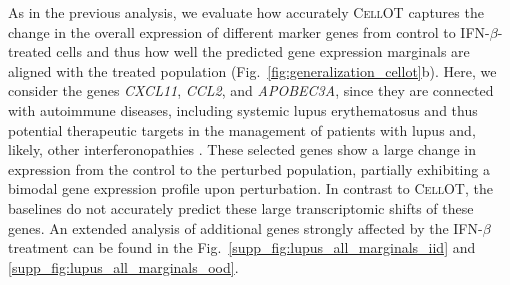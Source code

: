 As in the previous analysis, we evaluate how accurately \textsc{CellOT} captures the change in the overall expression of different marker genes from control to IFN-$\beta$-treated cells and thus how well the predicted gene expression marginals are aligned with the treated population (Fig.~\ref{fig:generalization_cellot}b). Here, we consider the genes \textit{CXCL11}, \textit{CCL2}, and \textit{APOBEC3A},
since they are connected with autoimmune diseases, including systemic lupus erythematosus \citep{hedrich2011epigenetic, perez2021sustained}
and thus potential therapeutic targets
in the management of patients with lupus and, likely, other interferonopathies \citep{mathian2015targeting,rani1996characterization,hedrich2011epigenetic,mathian2015targeting,perez2021sustained,flier2001differential}.
These selected genes show a large change in expression from the control to the perturbed population, partially exhibiting a bimodal gene expression profile upon perturbation. In contrast to \textsc{CellOT}, the baselines do not accurately predict these large transcriptomic shifts of these genes.
An extended analysis of additional genes strongly affected by the IFN-$\beta$ treatment can be found in the Fig.~\ref{supp_fig:lupus_all_marginals_iid} and \ref{supp_fig:lupus_all_marginals_ood}.

